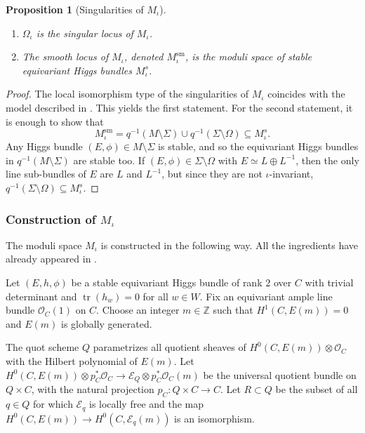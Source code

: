\documentclass[JEP,XML,SOM,Unicode, NoEqCountersInSection,NoFloatCountersInSection,published]{cedram}
\let\mathcal\mathscr
\newtheorem{prop}[thm]{Proposition}
\theoremstyle{definition}
\newcommand{\ZZ}{\mathbb{Z}}
\newcommand{\Tr}{\operatorname{tr}}
\begin{document}
\skpt
\begin{prop}[Singularities of $M_{\iota}$]\label{prop:singMiota}
\begin{enumerate}
\item\label{item:singlocus} $\Omega_\iota$ is the singular locus of $M_{\iota}$.
\item\label{item:smoothlocus} The smooth locus of $M_{\iota}$, denoted $M_{\iota}^{\mathrm{sm}}$, is the moduli space of stable equivariant Higgs bundles $M^{s}_{\iota}$.
\end{enumerate}
\end{prop}
\begin{proof}
The local isomorphism type of the singularities of $M_{\iota}$ coincides with the model described in \cite[Lem.\,3.1]{MRS18}. This yields the first statement. For the second statement, it is enough to show that
\[
M_{\iota}^{\mathrm{sm}} = q^{-1}(M \setminus \Sigma) \cup q^{-1}(\Sigma \setminus \Omega) \subseteq M^{s}_{\iota}.
\]
Any Higgs bundle $(E, \phi) \in M \setminus \Sigma$ is stable, and so the equivariant Higgs bundles in $q^{-1}(M \setminus \Sigma)$ are stable too. If $(E, \phi) \in \Sigma \setminus \Omega$ with $E \simeq L \oplus L^{-1}$, then the only line sub-bundles of $E$ are $L$ and $L^{-1}$, but since they are not $\iota$-invariant, $q^{-1}(\Sigma \setminus \Omega) \subseteq M^{s}_{\iota}$.
\end{proof}

\subsubsection{Construction of $M_{\iota}$}\label{sec:constructionMi}
The moduli space $M_{\iota}$ is constructed in the following way. All the ingredients have already appeared in \cite{Seshadri70, Nitsure91, Hausel98}.

Let $(E,h,\phi)$ be a stable equivariant Higgs bundle of rank $2$ over $C$ with trivial determinant and $\Tr(h_{w})=0$ for all $w \in W$. Fix an equivariant ample line bundle $\mathcal{O}_C(1)$ on $C$. Choose an integer $m \in \ZZ$ such that $H^1(C, E(m))=0$ and $E(m)$ is globally generated.

The quot scheme $Q$ parametrizes all quotient sheaves of $H^0(C, E(m)) \otimes \mathcal{O}_C$ with the Hilbert polynomial of $E(m)$. Let $H^0(C, E(m)) \otimes p_C^*\mathcal{O}_{C} \to \mathcal{E}_Q \otimes p_C^*\mathcal{O}_C(m)$ be the universal quotient bundle on $Q \times C$, with the natural projection $p_C \colon Q \times C \to C$. Let $R \subset Q$ be the subset of all $q \in Q$ for which $\mathcal{E}_q$ is locally free and the map $H^0(C, E(m)) \to H^0(C, \mathcal{E}_q(m))$ is an isomorphism.
\end{document}
